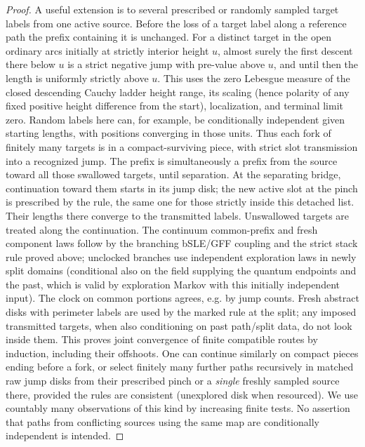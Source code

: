 \begin{proof}
A useful extension is to several prescribed or randomly sampled target labels from one active source.
Before the loss of a target label along a reference path the prefix containing it is unchanged.
For a distinct target in the open ordinary arcs initially at strictly interior height \(u\), almost surely the first descent there below \(u\) is a strict negative jump with pre-value above \(u\), and until then the length is uniformly strictly above \(u\).
This uses the zero Lebesgue measure of the closed descending Cauchy ladder height range, its scaling (hence polarity of any fixed positive height difference from the start), localization, and terminal limit zero.
Random labels here can, for example, be conditionally independent given starting lengths, with positions converging in those units.
Thus each fork of finitely many targets is in a compact-surviving piece, with strict slot transmission into a recognized jump.
The prefix is simultaneously a prefix from the source toward all those swallowed targets, until separation.
At the separating bridge, continuation toward them starts in its jump disk; the new active slot at the pinch is prescribed by the rule, the same one for those strictly inside this detached list.
Their lengths there converge to the transmitted labels.
Unswallowed targets are treated along the continuation.
The continuum common-prefix and fresh component laws follow by the branching bSLE/GFF coupling and the strict stack rule proved above; unclocked branches use independent exploration laws in newly split domains (conditional also on the field supplying the quantum endpoints and the past, which is valid by exploration Markov with this initially independent input).
The clock on common portions agrees, e.g. by jump counts.
Fresh abstract disks with perimeter labels are used by the marked rule at the split; any imposed transmitted targets, when also conditioning on past path/split data, do not look inside them.
This proves joint convergence of finite compatible routes by induction, including their offshoots.
One can continue similarly on compact pieces ending before a fork, or select finitely many further paths recursively in matched raw jump disks from their prescribed pinch or a \emph{single} freshly sampled source there, provided the rules are consistent (unexplored disk when resourced).
We use countably many observations of this kind by increasing finite tests.
No assertion that paths from conflicting sources using the same map are conditionally independent is intended.

\end{proof}

